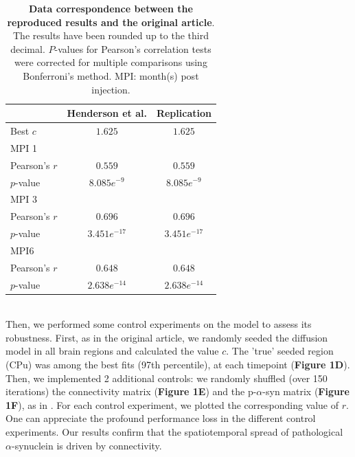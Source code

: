 \begin{table}[ht]
  \begin{center}
    \centering
    
    \begin{tabular}{|l|c|c|} %
      \hline
      
      &\textbf{Henderson et al.} & \textbf{Replication} \hspace{1cm}\\

      \hline
      Best  $c$  & $1.625$ & $1.625$ \\
      MPI 1 & &\\
            \hspace{1cm} Pearson's $r$ & $0.559$ & $0.559$\\
            \hspace{1cm} $p$-value & $8.085e^{-9}$ & $8.085e^{-9}$ \\ 
      MPI 3& &\\
            \hspace{1cm} Pearson's $r$ & $0.696$ & $0.696$ \\
            \hspace{1cm} $p$-value & $3.451e^{-17}$ &  $3.451e^{-17}$ \\ 
       
      MPI6& &\\
            \hspace{1cm} Pearson's $r$ & $0.648$ & $0.648$ \\
            \hspace{1cm} $p$-value & $2.638e^{-14}$& $2.638e^{-14}$ \\ 
      \hline
      
    \end{tabular}
    \caption{\textbf{Data correspondence between the reproduced results and the original article}. The results have been rounded up to the third decimal. $P$-values for Pearson's correlation tests were corrected for multiple comparisons using Bonferroni's method. MPI: month(s) post injection.}
  \end{center}
\end{table}

\\
Then, we performed some control experiments on the model to assess its robustness. First, as in the original article, we randomly seeded the diffusion model in all brain regions and calculated the value $c$. The 'true' seeded region (CPu) was among the best fits (97th percentile), at each timepoint (\textbf{Figure 1D}). Then, we implemented 2 additional controls: we randomly shuffled (over 150 iterations) the connectivity matrix (\textbf{Figure 1E}) and the p-$\alpha$-syn matrix (\textbf{Figure 1F}), as in \cite{Pandya_2017}. For each control experiment, we plotted the corresponding value of $r$. One can appreciate the profound performance loss in the different control experiments. Our results confirm that the spatiotemporal spread of pathological $\alpha$-synuclein is driven by connectivity.


